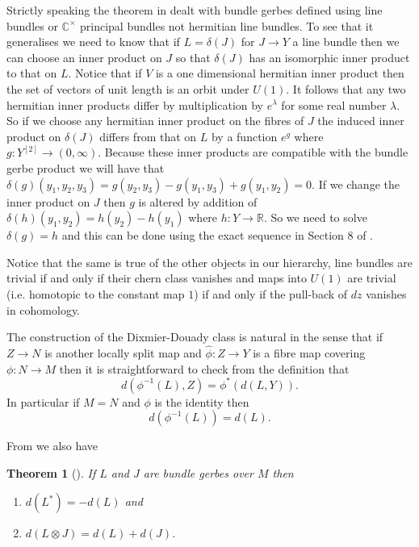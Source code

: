 \documentclass[a4paper,reqno]{amsart}
\theoremstyle{plain}
\newtheorem{theorem}{Theorem}[section]
\theoremstyle{definition}
\theoremstyle{remark}
\numberwithin{equation}{section}
\numberwithin{figure}{section}
\newcommand{\CC}{{\mathbb C}}
\newcommand{\RR}{{\mathbb R}}
\newcommand{\<}{\langle}
\renewcommand{\>}{\rangle}
\begin{document}
Strictly speaking the theorem in \cite{Mur} dealt with bundle gerbes defined
using line bundles or $\CC^\times$ principal bundles not hermitian
line bundles.  To see
that it generalises we need to know that if $L = \delta(J)$ for $J
\to Y$ a line
bundle then we can choose an inner product on $J$ so that $\delta(J)$ has an
isomorphic inner product to that on $L$.  Notice that if $V$ is a
one dimensional hermitian inner product then the set of vectors of
unit length is an orbit under $U(1)$. It follows that any two hermitian
inner products differ by multiplication by $e^\lambda$ for some
real number $\lambda$.  So if we choose any
hermitian inner product on the fibres of $J$ the induced inner product
on $\delta(J)$ differs from that on $L$ by a function $e^g$
where $g  \colon Y^{[2]} \to (0, \infty)$.
Because these inner products are compatible with the bundle gerbe
product we will
have that $\delta(g)(y_1, y_2, y_3) = g(y_2, y_3) - g(y_1, y_3) +
g(y_1, y_2) = 0$.
If we change the inner product on $J$ then $g$ is altered by addition
of $\delta(h)(y_1, y_2) = h(y_2) - h(y_1)$ where $h \colon Y \to
\RR$.  So we need to solve
$\delta(g) = h$ and this can be done using the exact sequence  in
Section 8 of \cite{Mur}.

Notice that the same is true of the other objects in our hierarchy,
line bundles
are trivial if and only if their chern class vanishes and maps into
$U(1)$ are
trivial (i.e. homotopic to the constant map $1$) if and only if the pull-back
of $dz$ vanishes in cohomology.

The construction
of the Dixmier-Douady class is natural in the sense that
if $Z \to N$ is another locally split map
and $\hat\phi \colon Z \to Y$ is a  fibre map covering
$\phi \colon N \to M$ then it is straightforward to
check from the definition that
\begin{equation}
\label{eq:natural0}
d(\phi^{-1}(L), Z) = \phi^*(d(L, Y)).
\end{equation}
In particular if $M = N$ and $\phi $ is the identity
then
\begin{equation}
\label{eq:natural1}
d(\phi^{-1}(L)) = d(L).
\end{equation}

          From \cite{Mur} we also have
\begin{theorem}[\cite{Mur}]
\label{th:dd}
If $L$ and $J$ are bundle gerbes over $M$ then
\begin{enumerate}
\item $d(L^*) = -d(L)$ and
\item$d(L\otimes J) = d(L)
+ d(J)$.
\end{enumerate}
\end{theorem}
\end{document}
